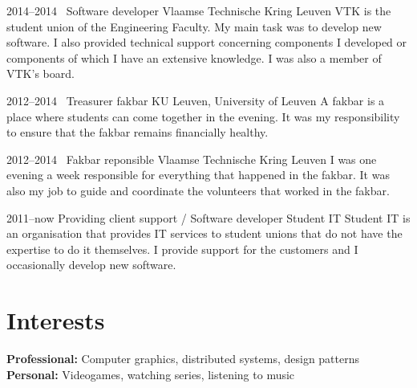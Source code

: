 \documentclass[a4paper]{friggeri-cv} %
\begin{document}
\begin{entrylist}
\entry
{2014--2014~}
{Software developer}
{Vlaamse Technische Kring Leuven}
{VTK is the student union of the Engineering Faculty. My main task was to develop new software. I also provided technical support concerning components I developed or components of which I have an extensive knowledge. I was also a member of VTK’s board.}

\entry
{2012--2014~}
{Treasurer fakbar}
{KU Leuven, University of Leuven}
{A fakbar is a place where students can come together in the evening. It was my responsibility to ensure that the fakbar remains financially healthy.}

\entry
{2012--2014~}
{Fakbar reponsible}
{Vlaamse Technische Kring Leuven}
{I was one evening a week responsible for everything that happened in the fakbar. It was also my job to guide and coordinate the volunteers that worked in the fakbar.}

\entry
{2011--now}
{Providing client support / Software developer}
{Student IT}
{Student IT is an organisation that provides IT services to student unions that do not have the expertise to do it themselves. I provide support for the customers and I occasionally develop new software.}

\end{entrylist}



\section{Interests}

\textbf{Professional:} Computer graphics, distributed systems, design patterns\\
\textbf{Personal:} Videogames, watching series, listening to music
\end{document}
